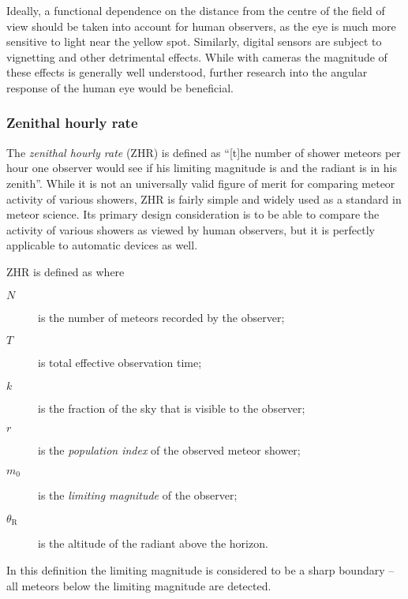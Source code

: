             Ideally, a functional dependence on the distance from the centre of the field
            of view should be taken into account for human observers, as the eye is much more
            sensitive to light near the yellow spot.
            Similarly, digital sensors are subject to vignetting and other detrimental effects.
            While with cameras the magnitude of these effects is generally well understood,
            further research into the angular response of the human eye would be beneficial.

        \subsubsection{Zenithal hourly rate} \label{msaz}
            The \emph{zenithal hourly rate} (ZHR) is defined as ``[t]he number of shower meteors per hour
            one observer would see if his limiting magnitude is  and the radiant is in his zenith''.
            While it is not an universally valid figure of merit for comparing meteor activity of various showers,
            ZHR is fairly simple and widely used as a standard in meteor science.
            Its primary design consideration is to be able to compare the activity of various showers
            as viewed by human observers, but it is perfectly applicable to automatic devices as well.

            ZHR is defined as
            where
            \begin{description}
                \item[$N$]
                    is the number of meteors recorded by the observer;
                \item[$T$]
                    is total effective observation time;
                \item[$k$]
                    is the fraction of the sky that is visible to the observer;
                \item[$r$]
                    is the \emph{population index} of the observed meteor shower;
                \item[$m_0$]
                    is the \emph{limiting magnitude} of the observer;
                \item[$\theta_\mathrm{R}$]
                    is the altitude of the radiant above the horizon.
            \end{description}
            In this definition the limiting magnitude is considered to be a sharp boundary -- all
            meteors below the limiting magnitude are detected.

